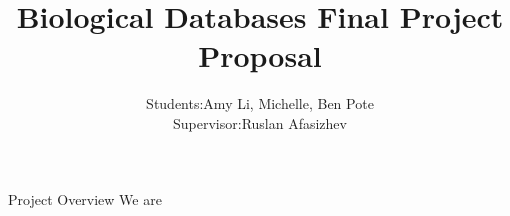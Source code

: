 \documentclass[a4paper,10pt,notitlepage]{article}
\title{Biological Databases Final Project Proposal}
\author{
    \begin{tabular}{l l}
    Students: & Amy Li, Michelle, Ben Pote \\
    Supervisor: & Ruslan Afasizhev \\
\end{tabular}
}
\begin{document}
\lstset{language=R}

\maketitle

\begin{section}{Project Overview}
    We are 

\end{section}
\end{document}
